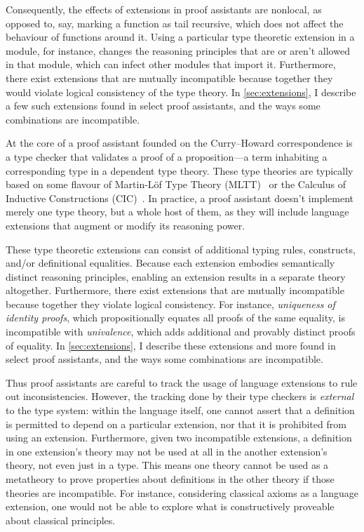 \documentclass{article}
\begin{document}
Consequently, the effects of extensions in proof assistants are nonlocal,
as opposed to, say, marking a function as tail recursive,
which does not affect the behaviour of functions around it.
Using a particular type theoretic extension in a module, for instance,
changes the reasoning principles that are or aren't allowed in that module,
which can infect other modules that import it.
Furthermore, there exist extensions that are mutually incompatible
because together they would violate logical consistency of the type theory.
In \cref{sec:extensions},
I describe a few such extensions found in select proof assistants,
and the ways some combinations are incompatible.
\fi

At the core of a proof assistant founded on the Curry--Howard correspondence
is a type checker that validates a proof of a proposition---a term inhabiting
a corresponding type in a dependent type theory.
These type theories are typically based on some flavour of
Martin-L\"of Type Theory (MLTT)~\citep{mltt}
or the Calculus of Inductive Constructions (CIC)~\citep{cic}.
In practice, a proof assistant doesn't implement merely one type theory,
but a whole host of them, as they will include language extensions
that augment or modify its reasoning power.

These type theoretic extensions can consist of additional typing rules,
constructs, and/or definitional equalities.
Because each extension embodies semantically distinct reasoning principles,
enabling an extension results in a separate theory altogether.
Furthermore, there exist extensions that are mutually incompatible
because together they violate logical consistency.
For instance, \emph{uniqueness of identity proofs},
which propositionally equates all proofs of the same equality,
is incompatible with \emph{univalence},
which adds additional and provably distinct proofs of equality.
In \cref{sec:extensions},
I describe these extensions and more found in select proof assistants,
and the ways some combinations are incompatible.

Thus proof assistants are careful to track
the usage of language extensions to rule out inconsistencies.
However, the tracking done by their type checkers is \emph{external} to the type system:
within the language itself,
one cannot assert that a definition is permitted to depend on a particular extension,
nor that it is prohibited from using an extension.
Furthermore, given two incompatible extensions,
a definition in one extension's theory may not be used at all
in the another extension's theory, not even just in a type.
This means one theory cannot be used as a metatheory
to prove properties about definitions in the other theory
if those theories are incompatible.
For instance, considering classical axioms as a language extension,
one would not be able to explore what is constructively proveable
about classical principles.
\end{document}

